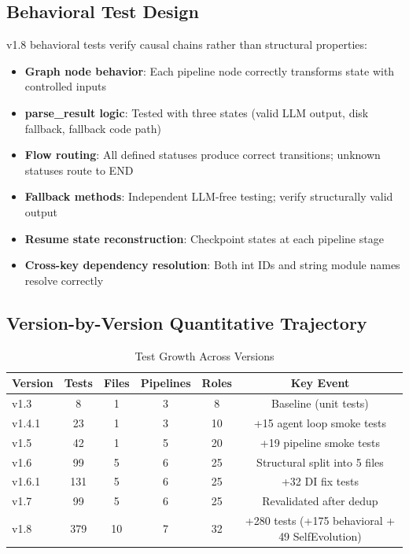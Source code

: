 \subsection{Behavioral Test Design}

v1.8 behavioral tests verify causal chains rather than structural properties:
\begin{itemize}
    \item \textbf{Graph node behavior}: Each pipeline node correctly transforms state with controlled inputs
    \item \textbf{parse\_result logic}: Tested with three states (valid LLM output, disk fallback, fallback code path)
    \item \textbf{Flow routing}: All defined statuses produce correct transitions; unknown statuses route to END
    \item \textbf{Fallback methods}: Independent LLM-free testing; verify structurally valid output
    \item \textbf{Resume state reconstruction}: Checkpoint states at each pipeline stage
    \item \textbf{Cross-key dependency resolution}: Both int IDs and string module names resolve correctly
\end{itemize}

\subsection{Version-by-Version Quantitative Trajectory}

\begin{table}[H]
\centering
\small
\caption{Test Growth Across Versions}
\label{tab:testgrowth}
\begin{tabular}{@{}lccccc@{}}
\toprule
\textbf{Version} & \textbf{Tests} & \textbf{Files} & \textbf{Pipelines} & \textbf{Roles} & \textbf{Key Event} \\
\midrule
v1.3   & 8   & 1  & 3 & 8  & Baseline (unit tests) \\
v1.4.1 & 23  & 1  & 3 & 10 & +15 agent loop smoke tests \\
v1.5   & 42  & 1  & 5 & 20 & +19 pipeline smoke tests \\
v1.6   & 99  & 5  & 6 & 25 & Structural split into 5 files \\
v1.6.1 & 131 & 5  & 6 & 25 & +32 DI fix tests \\
v1.7   & 99  & 5  & 6 & 25 & Revalidated after dedup \\
v1.8   & 379 & 10 & 7 & 32 & +280 tests (+175 behavioral + 49 SelfEvolution) \\
\bottomrule
\end{tabular}
\end{table}

